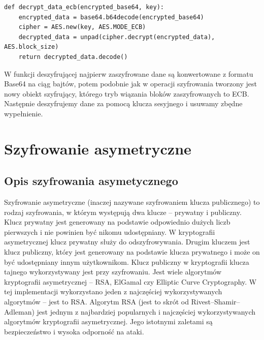 \begin{lstlisting}[caption={Deszyfrowanie danych}]
def decrypt_data_ecb(encrypted_base64, key):
    encrypted_data = base64.b64decode(encrypted_base64)
    cipher = AES.new(key, AES.MODE_ECB)
    decrypted_data = unpad(cipher.decrypt(encrypted_data), AES.block_size)
    return decrypted_data.decode()
\end{lstlisting}
W funkcji deszyfrującej najpierw zaszyfrowane dane są konwertowane z formatu Base64 na ciąg bajtów, potem podobnie jak w operacji szyfrowania tworzony jest nowy obiekt szyfrujący, którego tryb wiązania bloków zaszyfrowanych to ECB. Następnie deszyfrujemy dane za pomocą klucza sesyjnego i usuwamy zbędne wypełnienie.

\section{Szyfrowanie asymetryczne}

\subsection{Opis szyfrowania asymetycznego}
Szyfrowanie asymetryczne (inaczej nazywane szyfrowaniem klucza publicznego) to rodzaj szyfrowania, w którym występują dwa klucze – prywatny i publiczny. Klucz prywatny jest generowany na podstawie odpowiednio dużych liczb pierwszych i nie powinien być nikomu udostępniany. W kryptografii asymetrycznej klucz prywatny służy do odszyfrowywania. Drugim kluczem jest klucz publiczny, który jest generowany na podstawie klucza prywatnego i może on być udostępniany innym użytkownikom. Klucz publiczny w kryptografii klucza tajnego wykorzystywany jest przy szyfrowaniu. Jest wiele algorytmów kryptografii asymetrycznej – RSA, ElGamal czy Elliptic Curve Cryptography. W tej implementacji wykorzystano jeden z najczęściej wykorzystywanych algorytmów – jest to RSA. Algorytm RSA (jest to skrót od Rivest–Shamir–Adleman) jest jednym z najbardziej popularnych i najczęściej wykorzystywanych algorytmów kryptografii asymetrycznej. Jego istotnymi zaletami są bezpieczeństwo i wysoka odporność na ataki.

